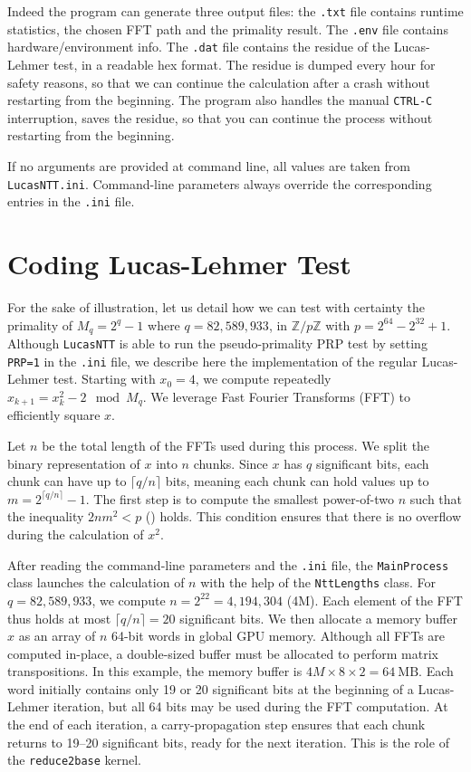 \documentclass{article}
\begin{document}
Indeed the program can generate three output files: the \texttt{.txt} file contains runtime statistics, the chosen FFT path and the primality result. The \texttt{.env} file contains hardware/environment info. The \texttt{.dat} file contains the residue of the Lucas-Lehmer test, in a readable hex format. The residue is dumped every hour for safety reasons, so that we can continue the calculation after a crash without restarting from the beginning. The program also handles the manual \texttt{CTRL-C} interruption, saves the residue, so that you can continue the process without restarting from the beginning.

If no arguments are provided at command line, all values are taken from \texttt{LucasNTT.ini}. Command-line parameters always override the corresponding entries in the \texttt{.ini} file.

\section{Coding Lucas-Lehmer Test}

For the sake of illustration, let us detail how we can test with certainty the primality of $M_q = 2^q - 1$ where $q = 82,\!589,\!933$, in $\mathbb{Z}/p\mathbb{Z}$ with $p = 2^{64} - 2^{32} + 1$. Although \texttt{LucasNTT} is able to run the pseudo-primality PRP test by setting \texttt{PRP=1} in the \texttt{.ini} file, we describe here the implementation of the regular Lucas-Lehmer test. Starting with $x_0 = 4$, we compute repeatedly $x_{k+1} = x_k^2 - 2 \mod M_q$. We leverage Fast Fourier Transforms (FFT) to efficiently square $x$.

Let $n$ be the total length of the FFTs used during this process. We split the binary representation of $x$ into $n$ chunks. Since $x$ has $q$ significant bits, each chunk can have up to $\lceil q / n \rceil$ bits, meaning each chunk can hold values up to
$m = 2^{\lceil q / n \rceil} - 1$.
The first step is to compute the smallest power-of-two $n$ such that the inequality
$2nm^2 < p$ (\cite{LucasNTT_multiplication}) holds. This condition ensures that there is no overflow during the calculation of $x^2$.

After reading the command-line parameters and the \texttt{.ini} file, the \texttt{MainProcess} class launches the calculation of $n$ with the help of the \texttt{NttLengths} class. For $q = 82,\!589,\!933$, we compute $n = 2^{22} = 4,\!194,\!304$ (4M). Each element of the FFT thus holds at most $\lceil q / n \rceil = 20$ significant bits. We then allocate a memory buffer $x$ as an array of $n$ 64-bit words in global GPU memory. Although all FFTs are computed in-place, a double-sized buffer must be allocated to perform matrix transpositions. In this example, the memory buffer is
$4M \times 8 \times 2 = 64\ \text{MB}$.
Each word initially contains only 19 or 20 significant bits at the beginning of a Lucas-Lehmer iteration, but all 64 bits may be used during the FFT computation. At the end of each iteration, a carry-propagation step ensures that each chunk returns to 19--20 significant bits, ready for the next iteration. This is the role of the \texttt{reduce2base} kernel.
\end{document}
